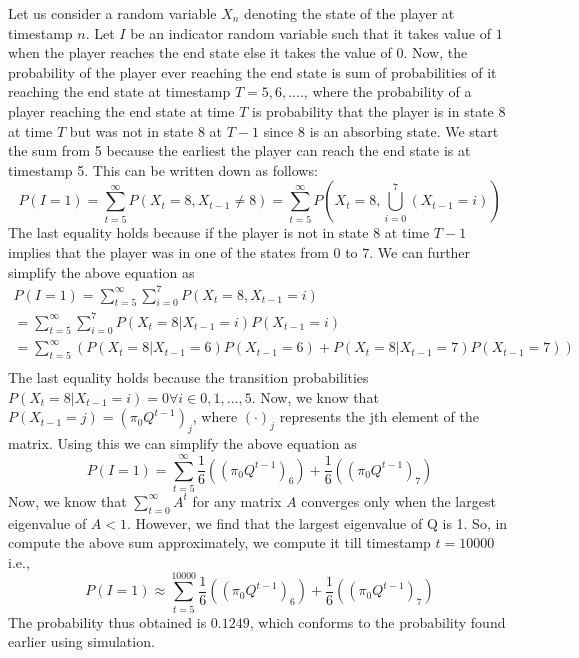 \documentclass{article}
\begin{document}
\begin{enumerate}
	    \noindent %
        Let us consider a random variable $X_{n}$ denoting the state of the player at timestamp $n$. Let $I$ be an indicator random 
        variable such that it takes value of $1$ when the player reaches the end state else it takes the value of $0$. Now, the 
        probability of the player ever reaching the end state is sum of probabilities of it reaching the end state at timestamp 
        $T=5, 6, .... $, where the probability of a player reaching the end state at time $T$ is probability that the player is in state
        8 at time $T$ but was not in state 8 at $T-1$ since 8 is an absorbing state. We start the sum from 5 because the earliest the player can reach the end state is 
        at timestamp 5. This can be written down as follows:
        \begin{equation}
        \nonumber
            P(I = 1) = \sum_{t=5}^{\infty} P(X_{t} = 8, X_{t-1} \neq 8) = \sum_{t=5}^{\infty} P\left (X_{t} = 8, \bigcup_{i=0}^{7} (X_{t-1} = i) \right )
        \end{equation}
        The last equality holds because if the player is not in state 8 at time $T-1$ implies that the player was in one of the states 
        from $0$ to $7$. We can 
        further simplify the above equation as
        \begin{equation}
        \nonumber
        \begin{gathered}
            P(I = 1) = \sum_{t=5}^{\infty} \sum_{i=0}^{7} P(X_{t} = 8, X_{t-1} = i)\\
                     = \sum_{t=5}^{\infty} \sum_{i=0}^{7} P(X_{t} = 8 | X_{t-1} = i)P(X_{t-1} = i) \\
                     = \sum_{t=5}^{\infty} (P(X_{t} = 8 | X_{t-1} = 6)P(X_{t-1} = 6) +  P(X_{t} = 8 | X_{t-1} = 7)P(X_{t-1} = 7))\\
        \end{gathered}
        \end{equation}
        The last equality holds because the transition probabilities $P(X_{t} = 8 | X_{t-1} = i) = 0 \forall i \in {0,1,...,5}$. Now, we
        know that $P(X_{t-1} = j) = (\pi_{0}Q^{t-1})_{j}$, where $(\cdot)_{j}$ represents the jth element of the matrix. Using this we can
        simplify the above equation as
        \begin{equation}
        \nonumber
            P(I=1) = \sum_{t=5}^{\infty} \frac{1}{6}((\pi_{0}Q^{t-1})_{6}) + \frac{1}{6}((\pi_{0}Q^{t-1})_{7})
        \end{equation}
        Now, we know that $\sum_{t=0}^{\infty} A^{t}$ for any matrix $A$ converges only when the largest eigenvalue of $A < 1$. However,
        we find that the largest eigenvalue of Q is 1. So, in compute the above sum approximately, we compute it till timestamp $t=10000$ i.e.,
        \begin{equation}
        \nonumber
            P(I=1) \approx \sum_{t=5}^{10000} \frac{1}{6}((\pi_{0}Q^{t-1})_{6}) + \frac{1}{6}((\pi_{0}Q^{t-1})_{7})
        \end{equation}
        The probability thus obtained is $0.1249$, which conforms to the probability found earlier using simulation. 
\end{enumerate}
\end{document}
